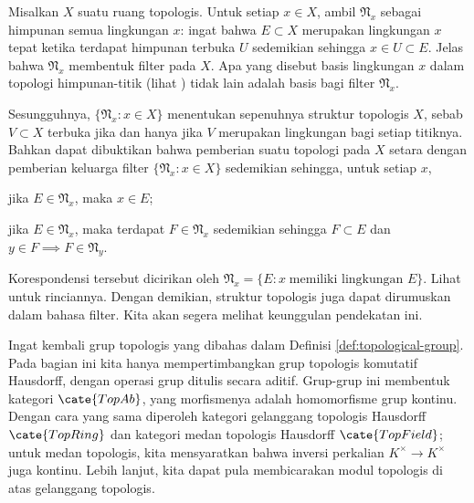 \begin{example}\label{eg:nbd-filter}
	Misalkan $X$ suatu ruang topologis. Untuk setiap $x \in X$, ambil $\mathfrak{N}_x$ sebagai himpunan semua lingkungan $x$: ingat bahwa $E \subset X$ merupakan lingkungan $x$ tepat ketika terdapat himpunan terbuka $U$ sedemikian sehingga $x \in U \subset E$. Jelas bahwa $\mathfrak{N}_x$ membentuk filter pada $X$. Apa yang disebut basis lingkungan $x$ dalam topologi himpunan-titik (lihat \cite[Definisi 2.6.3]{Xiong}) tidak lain adalah basis bagi filter $\mathfrak{N}_x$.

	Sesungguhnya, $\{ \mathfrak{N}_x : x \in X \}$ menentukan sepenuhnya struktur topologis $X$, sebab $V \subset X$ terbuka jika dan hanya jika $V$ merupakan lingkungan bagi setiap titiknya. Bahkan dapat dibuktikan bahwa pemberian suatu topologi pada $X$ setara dengan pemberian keluarga filter $\{ \mathfrak{N}_x  : x \in X\}$ sedemikian sehingga, untuk setiap $x$,
	\begin{compactitem}
		\item jika $E \in \mathfrak{N}_x$, maka $x \in E$;
		\item jika $E \in \mathfrak{N}_x$, maka terdapat $F \in \mathfrak{N}_x$ sedemikian sehingga $F \subset E$ dan $y \in F \implies F \in \mathfrak{N}_y$.
	\end{compactitem}
	Korespondensi tersebut dicirikan oleh $\mathfrak{N}_x = \{E : x\; \text{memiliki lingkungan }E\}$. Lihat \cite[Teorema 2.3.3]{Xiong} untuk rinciannya. Dengan demikian, struktur topologis juga dapat dirumuskan dalam bahasa filter. Kita akan segera melihat keunggulan pendekatan ini.
\end{example}

Ingat kembali grup topologis yang dibahas dalam Definisi \ref{def:topological-group}. Pada bagian ini kita hanya mempertimbangkan grup topologis komutatif Hausdorff, dengan operasi grup ditulis secara aditif. Grup-grup ini membentuk kategori $\cate{TopAb}$, yang morfismenya adalah homomorfisme grup kontinu. Dengan cara yang sama diperoleh kategori gelanggang topologis Hausdorff $\cate{TopRing}$ dan kategori medan topologis Hausdorff $\cate{TopField}$; untuk medan topologis, kita mensyaratkan bahwa inversi perkalian $K^\times \to K^\times$ juga kontinu. Lebih lanjut, kita dapat pula membicarakan modul topologis di atas gelanggang topologis.   

